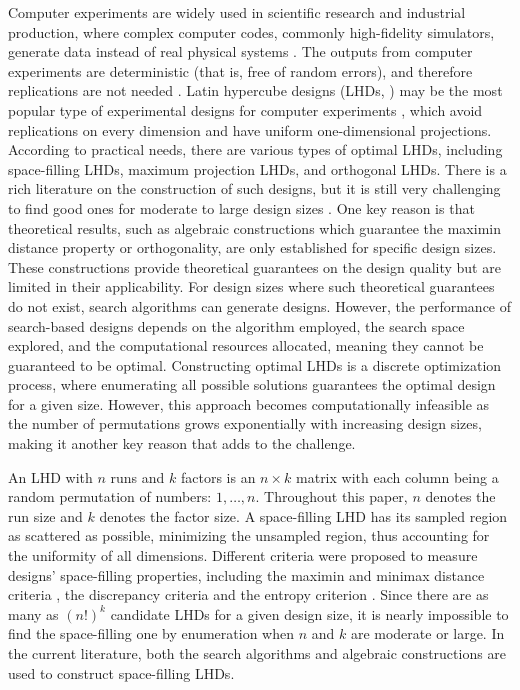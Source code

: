 Computer experiments are widely used in scientific research and industrial production, where
complex computer codes, commonly high-fidelity simulators, generate data instead of real physical systems \citep{sacks1989designs, fang2005design}. The outputs from computer experiments are deterministic (that is, free of random errors), and therefore replications are not needed \citep{butler2001optimal, joseph2008orthogonal, ba2015optimal}. Latin hypercube designs (LHDs, \cite{mckay1979comparison}) may be the most popular type of experimental designs for computer experiments \citep{fang2005design, xiao2018construction}, which avoid replications on every dimension and have uniform one-dimensional projections. According to practical needs, there are various types of optimal LHDs, including space-filling LHDs, maximum projection LHDs, and orthogonal LHDs. There is a rich literature on the construction of such designs, but it is still very challenging to find good ones for moderate to large design sizes \citep{ye1998orthogonal, fang2005design, joseph2015maximum, xiao2018construction}. One key reason is that theoretical results, such as algebraic constructions which guarantee the maximin distance property or orthogonality, are only established for specific design sizes. These constructions provide theoretical guarantees on the design quality but are limited in their applicability. For design sizes where such theoretical guarantees do not exist, search algorithms can generate designs. However, the performance of search-based designs depends on the algorithm employed, the search space explored, and the computational resources allocated, meaning they cannot be guaranteed to be optimal. Constructing optimal LHDs is a discrete optimization process, where enumerating all possible solutions guarantees the optimal design for a given size. However, this approach becomes computationally infeasible as the number of permutations grows exponentially with increasing design sizes, making it another key reason that adds to the challenge.

An LHD with $n$ runs and $k$ factors is an $n \times k$ matrix with each column being a random permutation of numbers: $1, \ldots, n$. Throughout this paper, $n$ denotes the run size and $k$ denotes the factor size. A space-filling LHD has its sampled region as scattered as possible, minimizing the unsampled region, thus accounting for the uniformity of all dimensions. Different criteria were proposed to measure designs' space-filling properties, including the maximin and minimax distance criteria \citep{johnson1990minimax, morris1995exploratory}, the discrepancy criteria \citep{hickernell1998generalized, fang2002centered, fang2005design} and the entropy criterion \citep{shewry1987maximum}. Since there are as many as $(n!)^{k}$ candidate LHDs for a given design size, it is nearly impossible to find the space-filling one by enumeration when $n$ and $k$ are moderate or large.  In the current literature, both the search algorithms \citep{morris1995exploratory, leary2003optimal, joseph2008orthogonal, ba2015optimal, kenny2000algorithmic, jin2005efficient, liefvendahl2006study, grosso2009finding, chen2013optimizing} and algebraic constructions \citep{zhou2015space, xiao2017construction, wang2018optimal} are used to construct space-filling LHDs.

